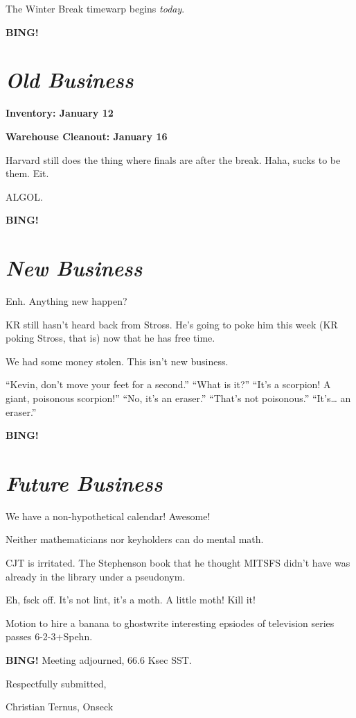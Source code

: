 \documentclass[10pt]{article}
\newcommand{\bing}{{\bf BING!} }
\newcommand{\goto}[1]{\bing \vskip 12pt \section*{{\em{#1}}}}
\begin{document}
The Winter Break timewarp begins \emph{today}.

\goto{Old Business}

\textbf{Inventory: January 12}

\textbf{Warehouse Cleanout: January 16}

Harvard still does the thing where finals are after the break.  Haha, sucks to be them.  Eit.

ALGOL.

\goto{New Business}

Enh.  Anything new happen?

KR still hasn't heard back from Stross.  He's going to poke him this week (KR poking Stross, that is) now that he has free time.

We had some money stolen.  This isn't new business.

``Kevin, don't move your feet for a second.'' ``What is it?'' ``It's a scorpion!  A giant, poisonous scorpion!'' ``No, it's an eraser.'' ``That's not poisonous.''  ``It's\ldots{} an eraser.''

\goto{Future Business}

We have a non-hypothetical calendar!  Awesome!

Neither mathematicians nor keyholders can do mental math.

CJT is irritated.  The Stephenson book that he thought MITSFS didn't have was already in the library under a pseudonym.

Eh, fsck off.  It's not lint, it's a moth.  A little moth!  Kill it!

Motion to hire a banana to ghostwrite interesting epsiodes of television series passes 6-2-3+Spehn.

\bing
\noindent
Meeting adjourned, 66.6 Ksec SST.

\vspace{18pt}

\centerline{Respectfully submitted,}
\centerline{Christian Ternus, Onseck}
\end{document}
